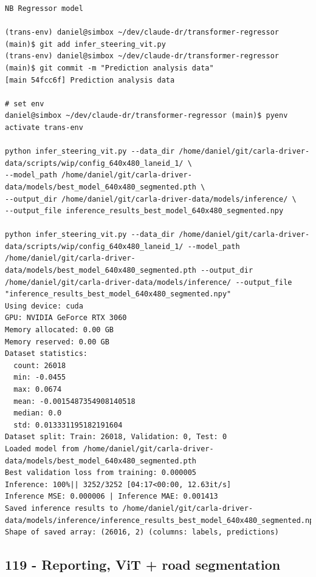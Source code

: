 \begin{verbatim}
NB Regressor model

(trans-env) daniel@simbox ~/dev/claude-dr/transformer-regressor (main)$ git add infer_steering_vit.py 
(trans-env) daniel@simbox ~/dev/claude-dr/transformer-regressor (main)$ git commit -m "Prediction analysis data"
[main 54fcc6f] Prediction analysis data

# set env
daniel@simbox ~/dev/claude-dr/transformer-regressor (main)$ pyenv activate trans-env

python infer_steering_vit.py --data_dir /home/daniel/git/carla-driver-data/scripts/wip/config_640x480_laneid_1/ \
--model_path /home/daniel/git/carla-driver-data/models/best_model_640x480_segmented.pth \
--output_dir /home/daniel/git/carla-driver-data/models/inference/ \
--output_file inference_results_best_model_640x480_segmented.npy

python infer_steering_vit.py --data_dir /home/daniel/git/carla-driver-data/scripts/wip/config_640x480_laneid_1/ --model_path /home/daniel/git/carla-driver-data/models/best_model_640x480_segmented.pth --output_dir /home/daniel/git/carla-driver-data/models/inference/ --output_file "inference_results_best_model_640x480_segmented.npy"
Using device: cuda
GPU: NVIDIA GeForce RTX 3060
Memory allocated: 0.00 GB
Memory reserved: 0.00 GB
Dataset statistics:
  count: 26018
  min: -0.0455
  max: 0.0674
  mean: -0.0015487354908140518
  median: 0.0
  std: 0.013331195182191604
Dataset split: Train: 26018, Validation: 0, Test: 0
Loaded model from /home/daniel/git/carla-driver-data/models/best_model_640x480_segmented.pth
Best validation loss from training: 0.000005
Inference: 100%|| 3252/3252 [04:17<00:00, 12.63it/s]
Inference MSE: 0.000006 | Inference MAE: 0.001413
Saved inference results to /home/daniel/git/carla-driver-data/models/inference/inference_results_best_model_640x480_segmented.npy
Shape of saved array: (26016, 2) (columns: labels, predictions)

\end{verbatim}

\subsection{119 - Reporting, ViT + road segmentation}
\label{app_res:119}

